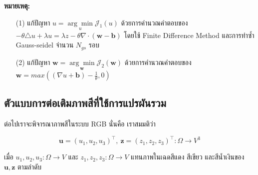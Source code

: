 \documentclass[hidelinks, a4paper,12pt]{article}
\numberwithin{equation}{section}							%
\numberwithin{equation}{section}
\begin{document}
{\begin{itemize}
\begin{algorithm}[H]
	\end{algorithm}
	\clearpage
	\textbf{หมายเหตุ:}
	\begin{itemize}
		\item [(1)] แก้ปัญหา $ u = \underset{u}{\arg\min} \mathcal{J}_1(u) $ ด้วยการคำนวณคำตอบของ $ - \theta \triangle u + \lambda u = \lambda z - \theta \nabla \cdot (\boldsymbol{w}-\boldsymbol{b})$ โดยใช้ Finite Difference Method และการทำซ้ำ Gauss-seidel จำนวน $N_{gs}$ รอบ
		\item [(2)] แก้ปัญหา $ \boldsymbol{w} = \underset{\boldsymbol{w}}{\arg\min} \mathcal{J}_2(\boldsymbol{w}) $ ด้วยการคำนวณคำตอบของ $\boldsymbol{w} = max((\nabla u + \boldsymbol{b}) - \frac{1}{\theta},0)$
	\end{itemize}
\end{itemize}

\subsection{ตัวแบบการต่อเติมภาพสีที่ใช้การแปรผันรวม}\label{inpaint-model-color}

\hspace{1cm} ต่อไปเราจะพิจารณาภาพสีในระบบ RGB นั่นคือ เราสมมติว่า

$$ \boldsymbol{u} = (u_1,u_2,u_3)^{\top},\ \boldsymbol{z} = (z_1,z_2,z_3)^{\top} : \Omega  \rightarrow V^3 $$

\noindent เมื่อ $u_1,u_2,u_3: \Omega  \rightarrow V$ และ $z_1,z_2,z_3: \Omega  \rightarrow V$ แทนภาพในเฉดสีแดง สีเขียว และสีน้ำเงินของ $\boldsymbol{u},\boldsymbol{z}$ ตามลำดับ 

}
\end{document}
